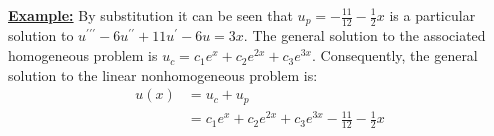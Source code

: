 \vspace{0.25cm}

\noindent\textbf{\underline{Example:}} By substitution it can be seen that $u_p = -\frac{11}{12}-\frac{1}{2}x$ is a particular solution to $u^{\prime \prime \prime}-6u^{\prime \prime} + 11u^{\prime} - 6u=3x$.  The general solution to the associated homogeneous problem is $u_c = c_1e^{x}+c_2e^{2x}+c_3e^{3x}$.  Consequently, the general solution to the linear nonhomogeneous problem is:
\begin{align*}
u(x) &= u_c + u_p \\
&=c_1e^{x}+c_2e^{2x}+c_3e^{3x}-\frac{11}{12}-\frac{1}{2}x
\end{align*}

